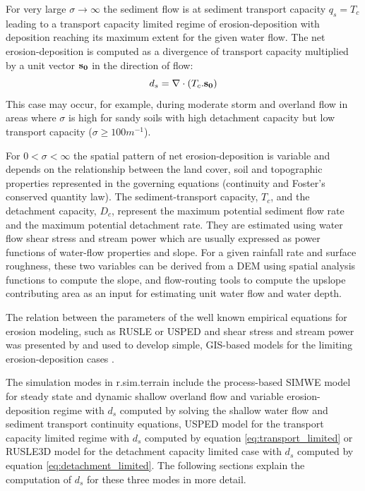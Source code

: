 \documentclass[gmd, manuscript]{copernicus}
\begin{document}
For very large $\sigma \to \infty$ the sediment flow is at sediment transport capacity $q_s = T_c$ 
leading to a transport capacity limited regime of erosion-deposition with deposition reaching its maximum
extent for the given water flow. The net erosion-deposition is computed as a divergence of
transport capacity multiplied by a unit vector ${\bf s_0}$ in the direction of flow:
\begin{equation}
\label{eq:transport_limited}
 d_s = \nabla\cdot (T_c . {\bf s_0})
\end{equation}
This case may occur, for example, during moderate storm and overland flow in areas 
where $\sigma$ is high for sandy soils with high detachment capacity but
low transport capacity  ($\sigma \geq 100 \unit{m}^{-1}$).

For $0 < \sigma < \infty$ the spatial pattern of net erosion-deposition is variable and depends on the 
relationship between the land cover, soil and topographic properties represented in the governing equations 
(continuity and Foster's conserved quantity law).
The sediment-transport capacity, $T_c $, and the detachment capacity, $D_c $,
represent the maximum potential sediment flow rate and the maximum potential
detachment rate. They are estimated using water flow shear stress and stream power
which are usually expressed as power functions of water-flow properties and slope.    
For a given rainfall rate and surface roughness, these two variables can be derived from a DEM
using spatial analysis functions to compute the slope, and flow-routing
tools to compute the upslope contributing area as an input for estimating unit water flow and water depth.

The relation between the parameters of the well known empirical equations for erosion modeling, such as RUSLE or USPED 
and shear stress and stream power was presented by \citep{MooreBurch1984} and used to develop
simple, GIS-based models for the limiting erosion-deposition cases \citep{Mitasova2001}.

The simulation modes in r.sim.terrain include the process-based SIMWE model for
steady state and dynamic shallow overland flow and variable erosion-deposition regime with $d_s$ computed 
by solving the shallow water flow and sediment transport continuity equations,
USPED model for the transport capacity limited regime with $d_s$ computed by equation \ref{eq:transport_limited}
 or RUSLE3D model for the detachment capacity limited case with $d_s$ computed by equation \ref{eq:detachment_limited}. 
The following sections explain the computation of $d_s$ for these three modes in more detail.
\end{document}
